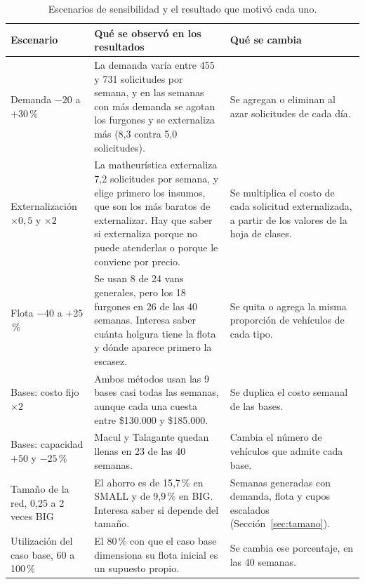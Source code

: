 \begin{table}[htbp]
\centering
\caption{Escenarios de sensibilidad y el resultado que motivó cada uno.}\label{tab:escenarios}
\footnotesize
\begin{tabularx}{\textwidth}{lYY}
\toprule
Escenario & Qué se observó en los resultados & Qué se cambia \\
\midrule
Demanda $-20$ a $+30$\,\% & La demanda varía entre 455 y 731 solicitudes por semana, y en las semanas con más demanda se agotan los furgones y se externaliza más (8,3 contra 5,0 solicitudes). & Se agregan o eliminan al azar solicitudes de cada día. \\
Externalización $\times0{,}5$ y $\times2$ & La matheurística externaliza 7,2 solicitudes por semana, y elige primero los insumos, que son los más baratos de externalizar. Hay que saber si externaliza porque no puede atenderlas o porque le conviene por precio. & Se multiplica el costo de cada solicitud externalizada, a partir de los valores de la hoja de clases. \\
Flota $-40$ a $+25$\,\% & Se usan 8 de 24 vans generales, pero los 18 furgones en 26 de las 40 semanas. Interesa saber cuánta holgura tiene la flota y dónde aparece primero la escasez. & Se quita o agrega la misma proporción de vehículos de cada tipo. \\
Bases: costo fijo $\times2$ & Ambos métodos usan las 9 bases casi todas las semanas, aunque cada una cuesta entre \$130.000 y \$185.000. & Se duplica el costo semanal de las bases. \\
Bases: capacidad $+50$ y $-25$\,\% & Macul y Talagante quedan llenas en 23 de las 40 semanas. & Cambia el número de vehículos que admite cada base. \\
Tamaño de la red, 0,25 a 2 veces BIG & El ahorro es de 15,7\,\% en SMALL y de 9,9\,\% en BIG. Interesa saber si depende del tamaño. & Semanas generadas con demanda, flota y cupos escalados (Sección~\ref{sec:tamano}). \\
Utilización del caso base, 60 a 100\,\% & El 80\,\% con que el caso base dimensiona su flota inicial es un supuesto propio. & Se cambia ese porcentaje, en las 40 semanas. \\
\bottomrule
\end{tabularx}
\end{table}
